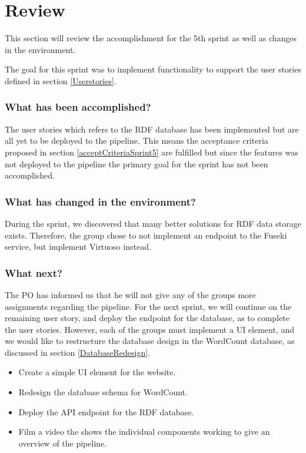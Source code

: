 \section{Review}
This section will review the accomplishment for the 5th sprint as well as changes in the \knox{} environment. 

The goal for this sprint was to implement functionality to support the user stories defined in section \ref{Userstories}. 

\subsubsection*{What has been accomplished?}
The user stories which refers to the RDF database has been implemented but are all yet to be deployed to the \knux{} pipeline. This means the acceptance criteria proposed in section \ref{acceptCriteriaSprint5} are fulfilled but since the features was not deployed to the pipeline the primary goal for the sprint has not been accomplished. 

\subsubsection*{What has changed in the environment?}
During the sprint, we discovered that many better solutions for RDF data storage exists. Therefore, the group chose to not implement an endpoint to the Fuseki service, but implement Virtuoso instead. 

\subsubsection*{What next?}
The PO has informed us that he will not give any of the \knox{} groups more assignments regarding the pipeline. 
For the next sprint, we will continue on the remaining user story, and deploy the endpoint for the database, as to complete the user stories. 
However, each of the \knox{} groups must implement a UI element, and we would like to restructure the database design in the WordCount database, as discussed in section \ref{DatabaseRedesign}.

\begin{itemize}
    \item Create a simple UI element for the \knox{} website.
    \item Redesign the database schema for WordCount.
    \item Deploy the API endpoint for the RDF database.
    \item Film a video the shows the individual components working to give an overview of the pipeline.
\end{itemize}

